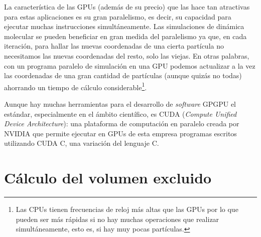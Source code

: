 La característica de las GPUs (además de su precio) que las hace tan atractivas para estas aplicaciones es su gran paralelismo, es decir, su capacidad para ejecutar muchas instrucciones simultáneamente. Las simulaciones de dinámica molecular se pueden beneficiar en gran medida del paralelismo ya que, en cada iteración, para hallar las nuevas coordenadas de una cierta partícula no necesitamos las nuevas coordenadas del resto, solo las viejas. En otras palabras, con un programa paralelo de simulación en una GPU podemos actualizar a la vez las coordenadas de una gran cantidad de partículas (aunque quizás no todas) ahorrando un tiempo de cálculo considerable\footnote{Las CPUs tienen frecuencias de reloj más altas que las GPUs por lo que pueden ser más rápidas si no hay muchas operaciones que realizar simultáneamente, esto es, si hay muy pocas partículas.}.

Aunque hay muchas herramientas para el desarrollo de \textit{software} GPGPU el estándar, especialmente en el ámbito científico, es CUDA \cite{Wilt2013} (\textit{Compute Unified Device Architecture}): una plataforma de computación en paralelo creada por NVIDIA que permite ejecutar en GPUs de esta empresa programas escritos utilizando CUDA C, una variación del lenguaje C.

\section{Cálculo del volumen excluido}

